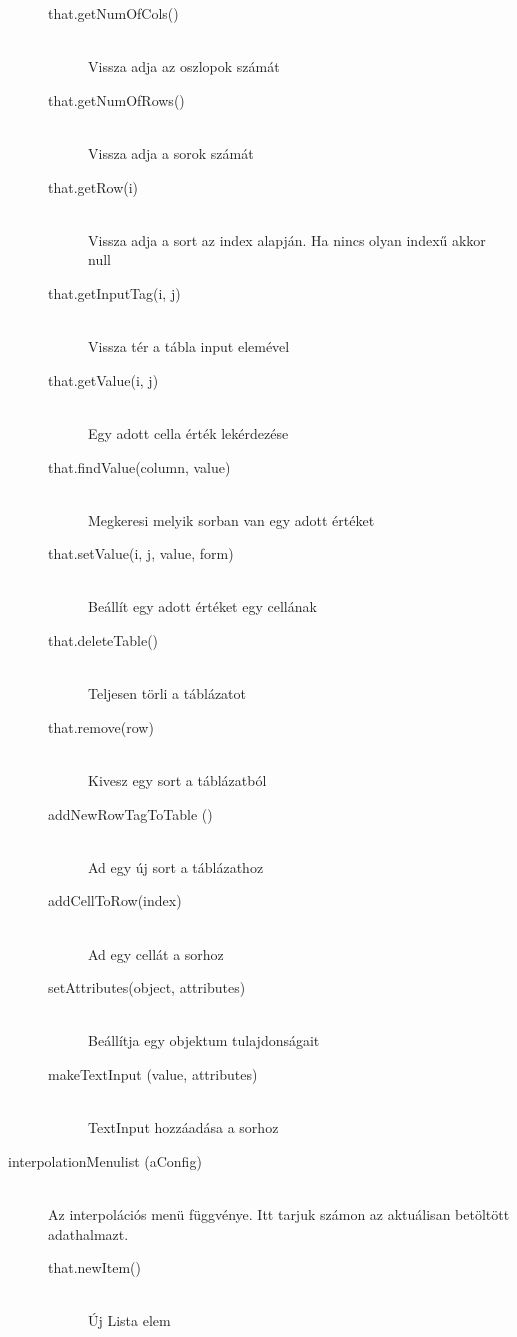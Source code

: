 \documentclass{elteikthesis}
\begin{document}
\begin{description}
\begin{description}
			\item[that.getNumOfCols()] 
			 	\hfill \\ Vissza adja az oszlopok számát
			\item[that.getNumOfRows()]
				\hfill \\ Vissza adja a sorok számát
			\item[that.getRow(i)]
				\hfill \\ Vissza adja a sort az index alapján. 
				Ha nincs olyan indexű akkor null
			\item[that.getInputTag(i, j)]
				\hfill \\ Vissza tér a tábla input elemével
			\item[that.getValue(i, j)]
				\hfill \\ Egy adott cella érték lekérdezése
			\item[that.findValue(column, value)] 
				\hfill \\ Megkeresi melyik sorban van egy adott értéket
			\item[that.setValue(i, j, value, form)]
				\hfill \\ Beállít egy adott értéket egy cellának
			\item[that.deleteTable()]
				\hfill \\ Teljesen törli a táblázatot
			\item[that.remove(row)]
				\hfill \\ Kivesz egy sort a táblázatból
			\item[addNewRowTagToTable ()]
				\hfill \\ Ad egy új sort a táblázathoz
			\item[addCellToRow(index)]
				\hfill \\ Ad  egy cellát a sorhoz
			\item[setAttributes(object, attributes)]
				\hfill \\ Beállítja egy objektum tulajdonságait
			\item[makeTextInput (value,  attributes)]
				\hfill \\  TextInput hozzáadása a sorhoz
			\end{description}
		\item[interpolationMenulist (aConfig)] 
			\hfill \\ 
			Az interpolációs menü függvénye. Itt tarjuk számon az aktuálisan betöltött adathalmazt.
			\begin{description}
			\item[that.newItem()] 
			\hfill \\ Új Lista elem

\end{description}
\end{description}
\end{document}
